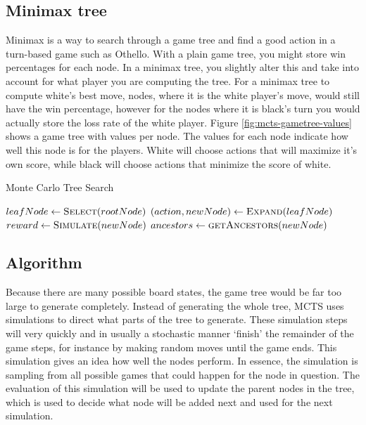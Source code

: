 \documentclass[
11pt, %
english, %
singlespacing, %
headsepline, %
]{MastersDoctoralThesis} %
\begin{document}
\subsection{Minimax tree}
Minimax is a way to search through a game tree and find a good action in a turn-based game such as Othello. With a plain game tree, you might store win percentages for each node. In a minimax tree, you slightly alter this and take into account for what player you are computing the tree. For a minimax tree to compute white's best move, nodes, where it is the white player's move, would still have the win percentage, however for the nodes where it is black's turn you would actually store the loss rate of the white player. Figure \ref{fig:mcts-gametree-values} shows a game tree with values per node. The values for each node indicate how well this node is for the players. White will choose actions that will maximize it's own score, while black will choose actions that minimize the score of white.
\vfill
\pagebreak
\begin{algorithm}
\caption{Monte Carlo Tree Search}
\label{algo:mcts}
\begin{algorithmic}
\State $leafNode \gets \Call{Select}{rootNode}$
\State $(action, newNode) \gets \Call{Expand}{leafNode}$
\State $reward \gets \Call{Simulate}{newNode}$
\State $ancestors \gets \Call{getAncestors}{newNode}$
\State \Return {}
\EndWhile
\State \Return {}
\EndFunction
\end{algorithmic}
\end{algorithm}
\subsection{Algorithm}
Because there are many possible board states, the game tree would be far too large to generate completely. Instead of generating the whole tree, MCTS uses simulations to direct what parts of the tree to generate. These simulation steps will very quickly and in usually a stochastic manner `finish' the remainder of the game steps, for instance by making random moves until the game ends. This simulation gives an idea how well the nodes perform. In essence, the simulation is sampling from all possible games that could happen for the node in question. The evaluation of this simulation will be used to update the parent nodes in the tree, which is used to decide what node will be added next and used for the next simulation.
\end{document}
